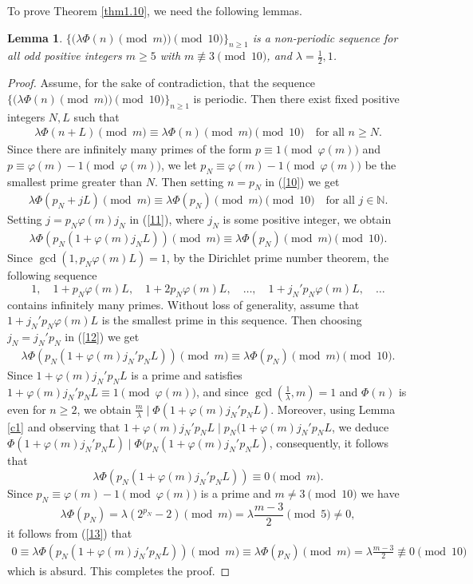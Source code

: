 \documentclass[12pt,reqno]{amsart}
\newtheorem{lemma} [theorem]{Lemma}
\begin{document}
To prove Theorem \ref{thm1.10}, we need the following lemmas.
\begin{lemma}\label{lemma3.1}
$\{\big(\lambda \Phi(n) \pmod{m}\big)\pmod{10}\}_{n\geq 1}$ is a non-periodic sequence for all odd positive integers $m\geq 5$ with $m\not\equiv 3 \pmod{10}$, and $\lambda =\frac{1}{2},1$.
\end{lemma}
\begin{proof}
Assume, for the sake of contradiction, that the sequence $\{\big(\lambda \Phi(n) \pmod{m}\big)\pmod{10}\}_{n\geq 1}$ is periodic. Then there exist fixed positive integers $N,L$ such that
\begin{align}\label{10}
\lambda \Phi(n+L) \pmod{m}\equiv \lambda \Phi(n) \pmod{m} \pmod{10}\quad \text{for all~}n\geq N.    
\end{align}
Since there are infinitely many primes of the form $p\equiv 1\pmod{\varphi(m)}$ and $p\equiv\varphi(m)-1\pmod{\varphi(m)}$, we let $p_N\equiv \varphi(m)-1\pmod{\varphi(m)}$ be the smallest prime greater than $N$. Then setting $n=p_N$ in (\ref{10}) we get
\begin{align}\label{11}
\lambda \Phi(p_N+jL) \pmod{m}\equiv \lambda \Phi(p_N) \pmod{m} \pmod{10}\quad \text{for all~}j\in\mathbb{N}.    
\end{align}
Setting $j=p_N\varphi(m)j_N$ in (\ref{11}), where $j_N$ is some positive integer, we obtain
\begin{align}\label{12}
\lambda \Phi(p_N(1+\varphi(m)j_NL))\pmod{m}\equiv \lambda \Phi(p_N) \pmod{m}\pmod{10}.    
\end{align}
Since $\gcd(1,p_N\varphi(m)L)=1$, by the Dirichlet prime number theorem, the following sequence
$$1, \quad 1+p_N\varphi(m)L, \quad 1+2p_N\varphi(m)L,\quad \ldots,\quad 1+j_N'p_N\varphi(m)L,\quad \ldots$$
contains infinitely many primes. Without loss of generality, assume that $1+j_N'p_N\varphi(m)L$ is the smallest prime in this sequence. Then choosing $j_N=j_N'p_N$ in (\ref{12}) we get
\begin{align}\label{13}
\lambda \Phi(p_N(1+\varphi(m)j_N'p_NL))\pmod{m}\equiv \lambda \Phi(p_N) \pmod{m}\pmod{10}.    
\end{align}
Since $1+\varphi(m)j_N'p_NL$ is a prime and satisfies $1+\varphi(m)j_N'p_NL\equiv 1 \pmod{\varphi(m)}$, and  since $\gcd(\frac{1}{\lambda},m)=1$ and $\Phi(n)$ is even for $n\geq2$, we obtain  $\frac{m}{\lambda}\mid \Phi(1+\varphi(m)j_N'p_NL)$. Moreover, using Lemma \ref{c1} and observing that $1+\varphi(m)j_N'p_NL\mid p_N(1+\varphi(m)j_N'p_NL$, we deduce  $\Phi(1+\varphi(m)j_N'p_NL)\mid \Phi(p_N(1+\varphi(m)j_N'p_NL)$, consequently, it follows that
$$\lambda\Phi(p_N(1+\varphi(m)j_N'p_NL))\equiv 0\pmod{m}.$$
Since $p_N\equiv \varphi(m)-1\pmod{\varphi(m)}$ is a prime and $m\neq3 \pmod{10}$ we have
$$\lambda\Phi(p_N)=\lambda(2^{p_N}-2)\pmod{m}=\lambda\frac{m-3}{2} \pmod{5}\neq0,$$
it follows from (\ref{13}) that
\begin{align*}
0\equiv\lambda\Phi(p_N(1+\varphi(m)j_N'p_NL))\pmod{m}\equiv \lambda\Phi(p_N) \pmod{m}=\lambda\frac{m-3}{2}\not\equiv 0\pmod{10}    
\end{align*}
which is absurd. This completes the proof.
\end{proof}
\end{document}
